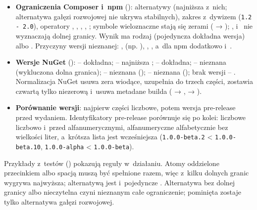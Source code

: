 \begin{itemize}
  \item \textbf{Ograniczenia Composer i~npm} (): alternatywy
        \repopath{||} (najniższa z~nich; alternatywa gałęzi rozwojowej nie ukrywa stabilnych),
        zakres z~dywizem (\texttt{1.2 - 2.0}), operatory \repopath{>=}, \repopath{>},
        \repopath{=}, \repopath{\textasciicircum}, \repopath{\textasciitilde}; symbole
        wieloznaczne stają się zerami ( → ); \repopath{<},
        \repopath{<=} i~\repopath{!=} nie wyznaczają dolnej granicy. Wynik ma rodzaj
         (pojedyncza dokładna wersja) albo . Przyczyny wersji
        nieznanej: ,  (np.
        ), , , a~dla npm dodatkowo
         i~.
  \item \textbf{Wersje NuGet} ():  -- dokładna;
        \repopath{[1.0,2.0)} -- najniższa ; \repopath{[1.0]} -- dokładna;
         -- nieznana (wykluczona dolna granica);  -- nieznana
        ();  -- nieznana
        (); brak wersji -- .
        Normalizacja NuGet usuwa zera wiodące, uzupełnia do trzech części, zostawia czwartą
        tylko niezerową i~usuwa metadane builda ( → ,
         → ).
  \item \textbf{Porównanie wersji}: najpierw części liczbowe, potem wersja pre-release przed
        wydaniem. Identyfikatory pre-release porównuje się po kolei: liczbowe liczbowo
        i~przed alfanumerycznymi, alfanumeryczne alfabetycznie bez wielkości liter, a~krótsza
        lista jest wcześniejsza (\texttt{1.0.0-beta.2} < \texttt{1.0.0-beta.10},
        \texttt{1.0.0-alpha} < \texttt{1.0.0-beta}).
\end{itemize}

Przykłady z~testów () pokazują reguły w~działaniu. Atomy
oddzielone przecinkiem albo spacją muszą być spełnione razem, więc z~kilku dolnych granic
wygrywa najwyższa; alternatywą jest \repopath{||} i~pojedyncze \repopath{|}. Alternatywa bez
dolnej granicy albo nieczytelna czyni nieznanym całe ograniczenie; pominięta zostaje tylko
alternatywa gałęzi rozwojowej.

